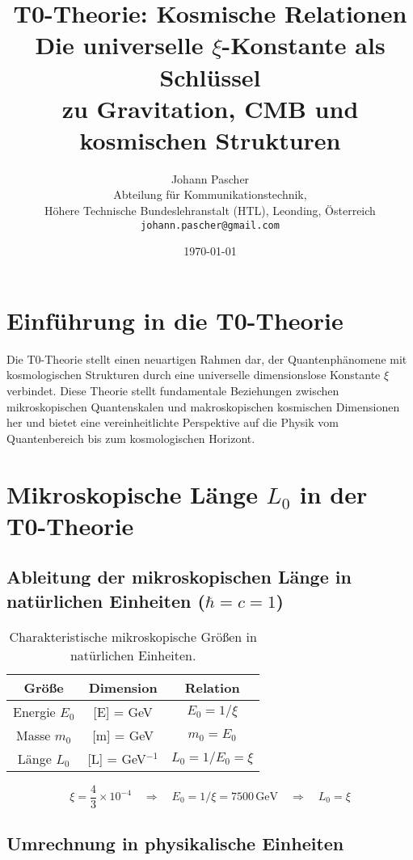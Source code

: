 \documentclass[12pt,a4paper]{article}
\title{\Huge\textbf{T0-Theorie: Kosmische Relationen}\\
	\Large Die universelle $\xi$-Konstante als Schlüssel \\ zu Gravitation, CMB und kosmischen Strukturen}
\author{\Large Johann Pascher\\
	Abteilung für Kommunikationstechnik,\\
	Höhere Technische Bundeslehranstalt (HTL), Leonding, Österreich\\
	\texttt{johann.pascher@gmail.com}}
\date{\today}
\numberwithin{equation}{section}
\begin{document}
	
	\maketitle
	\thispagestyle{fancy}
	
	\tableofcontents
	
	\section{Einführung in die T0-Theorie}
	
	Die T0-Theorie stellt einen neuartigen Rahmen dar, der Quantenphänomene mit kosmologischen Strukturen durch eine universelle dimensionslose Konstante $\xi$ verbindet. Diese Theorie stellt fundamentale Beziehungen zwischen mikroskopischen Quantenskalen und makroskopischen kosmischen Dimensionen her und bietet eine vereinheitlichte Perspektive auf die Physik vom Quantenbereich bis zum kosmologischen Horizont.
	
	\section{Mikroskopische Länge $L_0$ in der T0-Theorie}
	
	\subsection{Ableitung der mikroskopischen Länge in natürlichen Einheiten ($\hbar = c = 1$)}
	
	\begin{table}[h!]
		\centering
		\begin{tabular}{ccc}
			\toprule
			\textbf{Größe} & \textbf{Dimension} & \textbf{Relation} \\
			\midrule
			Energie $E_0$ & [E] = GeV & $E_0 = 1/\xi$ \\
			Masse $m_0$ & [m] = GeV & $m_0 = E_0$ \\
			Länge $L_0$ & [L] = GeV$^{-1}$ & $L_0 = 1/E_0 = \xi$ \\
			\bottomrule
		\end{tabular}
		\caption{Charakteristische mikroskopische Größen in natürlichen Einheiten.}
	\end{table}
	
	\[
	\xi = \frac{4}{3} \times 10^{-4} \quad \Rightarrow \quad E_0 = 1/\xi = 7500 \,\text{GeV} \quad \Rightarrow \quad L_0 = \xi
	\]
	
	\subsection{Umrechnung in physikalische Einheiten}
	
\end{document}
